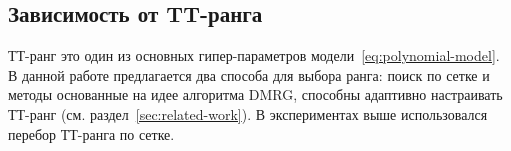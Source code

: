 \subsection{Зависимость от TT-ранга \label{sec:exp-tt-rank}}
ТТ-ранг это один из основных гипер-параметров модели~\eqref{eq:polynomial-model}. В данной работе предлагается два способа для выбора ранга: поиск по сетке и методы основанные на идее алгоритма DMRG, способны адаптивно настраивать ТТ-ранг (см. раздел~\ref{sec:related-work}). В экспериментах выше использовался перебор ТТ-ранга по сетке.

